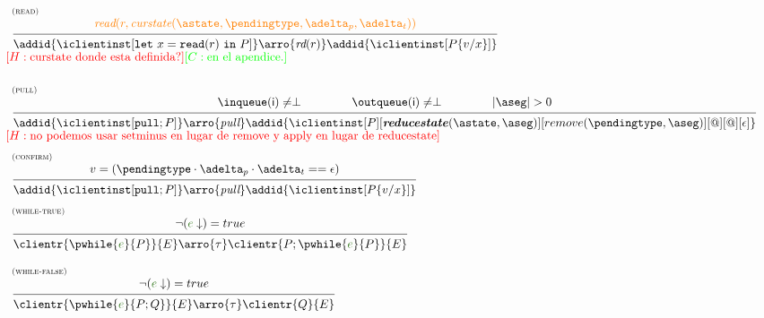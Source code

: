 \documentclass[envcountsect,runningheads,orivec]{llncs}
\begin{document}
\[\begin{array}{l}
\\[15pt]
	\mathrule{read}
		{\iread{r}{\curstate{\known}{\pending}{\pushbuffer}{\transactionbuffer}}}
		{\addid{\iclientinst[\treadins{x}{r}]} \arro{\readtran{r}} \addid{\iclientinst[{P}\subst{x}{v}]}}
\\
\henote{\mbox{curstate donde esta definida?}}
\chnote{\mbox{en el apendice.}}

\\[15pt]

	\mathrule{pull}
		{\appf{\inqueue}{\cid} \neq \undefined \qquad\qquad \appf{\outqueue}{\cid} \neq \undefined \qquad\qquad |\receivebuffer| > 0}
		{
			\addid{\iclientinst[\tpullins]}
			\arro{\pulltran} 
			\addid{\iclientinst[P]
						 [\reducestate{\known}{\receivebuffer}]
						 [\remove{\pending}{\receivebuffer}]
						 [@][@]
						 [{\epsilon}]
				}
		}
		\\
\henote{\mbox{no podemos usar setminus en lugar de remove y apply en lugar de reducestate}}
\\[5pt]
		\mathrule{confirm}
		{ v = (\pending \cdot \pushbuffer \cdot\transactionbuffer == \epsilon) }
		{
			\addid{\iclientinst[\tpullins]}
			\arro{\pulltran} 
			\addid{\iclientinst[P\subst{x}{v}]		
				}
		}
	
\\[20pt]

\mathrule{while-true}{\condition{\cond}{true}}{\clientr{\pwhile{\cond}{\tprogram}}{\stateclient} \arro{\tau} \clientr{\tprogram;\pwhile{\cond}{\tprogram}}{\stateclient}}

\\[25pt]

\mathrule{while-false}{\condition{\cond}{true}}{\clientr{\pwhile{\cond}{\tprogram;Q}}{\stateclient} \arro{\tau} \clientr{Q}{\stateclient}}



\end{array}\]
\end{document}
